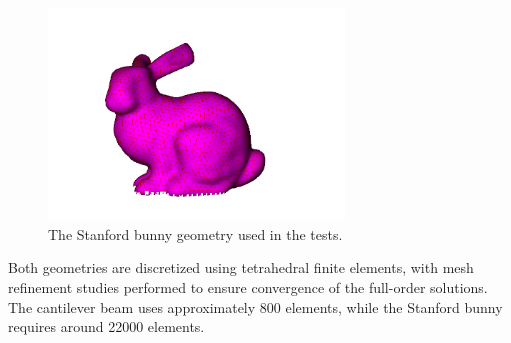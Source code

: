 \begin{figure}[ht]
    \centering
    \includegraphics[width=0.7\textwidth]{Images/stanford_bunny.png}
    \caption{The Stanford bunny geometry used in the tests.}
    \label{fig:stanford_bunny}
    \end{figure}

Both geometries are discretized using tetrahedral finite elements, with mesh refinement studies performed to ensure convergence of the full-order solutions. The cantilever beam uses approximately 800 elements, while the Stanford bunny requires around 22000 elements.
